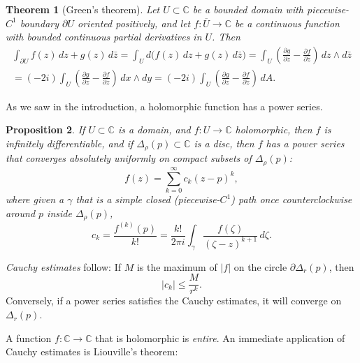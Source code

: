 \documentclass[12pt,openany]{book}
\newcommand{\sabs}[1]{\lvert {#1} \rvert}
\newcommand{\C}{{\mathbb{C}}}
\newcommand{\myindex}[1]{#1\index{#1}}
\theoremstyle{plain}
\newtheorem{thm}{Theorem}[section]
\newtheorem{prop}[thm]{Proposition}
\theoremstyle{remark}
\theoremstyle{definition}
\theoremstyle{exercise}
\theoremstyle{example}
\begin{document}
\begin{thm}[Green's theorem] \label{thm:greens}
Let $U \subset \C$ be a bounded domain with piecewise-$C^1$ boundary
$\partial U$ oriented positively, and let
$f \colon \overline{U} \to \C$ be a continuous function
with bounded continuous partial derivatives in $U$.
Then
\begin{multline*}
\int_{\partial U} f(z) \, dz + g(z) \, d\bar{z}
=
\int_{U} d \bigl( f(z) \, dz + g(z) \, d\bar{z} \bigr)
=
\int_{U}
\left(
\frac{\partial g}{\partial z}
-
\frac{\partial f}{\partial \bar{z}}
\right)
\, dz \wedge d\bar{z}
\\
=
(-2i)
\int_{U}
\left(
\frac{\partial g}{\partial z}
-
\frac{\partial f}{\partial \bar{z}}
\right)
\, dx \wedge dy 
=
(-2i)
\int_{U}
\left(
\frac{\partial g}{\partial z}
-
\frac{\partial f}{\partial \bar{z}}
\right)
\, dA.
\end{multline*}
\end{thm}

As we saw in the introduction, a holomorphic function has a power series.

\begin{prop}
If $U \subset \C$ is a domain, and $f \colon U \to \C$ holomorphic,
then $f$ is infinitely differentiable, and if $\Delta_\rho(p) \subset \C$
is a disc, then $f$ has a power series that
converges absolutely uniformly on compact subsets of $\Delta_\rho(p)$:
\begin{equation*}
f(z) = \sum_{k=0}^\infty c_k {(z-p)}^k ,
\end{equation*}
where given a $\gamma$ that is a simple closed (piecewise-$C^1$)
path once counterclockwise
around $p$ inside $\Delta_\rho(p)$,
\begin{equation*}
c_k = \frac{f^{(k)}(p)}{k!} =
\frac{k!}{2\pi i}
\int_{\gamma}
\frac{f(\zeta)}{{(\zeta-z)}^{k+1}}
\,
d \zeta  .
\end{equation*}
\end{prop}

\emph{\myindex{Cauchy estimates}} follow:  If $M$
is the maximum of $\sabs{f}$ on the circle $\partial \Delta_r(p)$, then
\begin{equation*}
\sabs{c_k} \leq \frac{M}{r^k} .
\end{equation*}
Conversely, if a power series satisfies the Cauchy estimates,
it will converge on $\Delta_r(p)$.

A function $f \colon \C \to \C$ that is holomorphic is
\emph{\myindex{entire}}.  An immediate application of Cauchy estimates
is Liouville's theorem:
\end{document}
